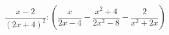\begin{ex}[type=expression]
	\begin{condition}
		\( \dfrac{x-2}{(2x+4)^2}:\left( \dfrac{x}{2x-4}-\dfrac{x^2+4}{2x^2-8}-\dfrac{2}{x^2+2x} \right) \)
	\end{condition}
\end{ex}